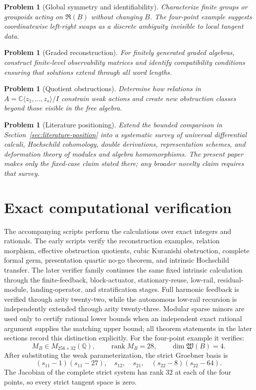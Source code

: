 \documentclass[11pt]{amsart}
\newtheorem{problem}[theorem]{Problem}
\newcommand{\rank}{\operatorname{rank}}
\newcommand{\Wfib}{\mathfrak W}
\newcommand{\Rfib}{\mathfrak R}
\newcommand{\C}{\mathbb C}
\begin{document}
\begin{problem}[Global symmetry and identifiability]
Characterize finite groups or groupoids acting on $\Rfib(B)$ without changing $B$.  The four-point example suggests coordinatewise left-right swaps as a discrete ambiguity invisible to local tangent data.
\end{problem}

\begin{problem}[Graded reconstruction]
For finitely generated graded algebras, construct finite-level observability matrices and identify compatibility conditions ensuring that solutions extend through all word lengths.
\end{problem}

\begin{problem}[Quotient obstructions]
Determine how relations in $A=\C\langle z_1,\ldots,z_s\rangle/I$ constrain weak actions and create new obstruction classes beyond those visible in the free algebra.
\end{problem}

\begin{problem}[Literature positioning]
Extend the bounded comparison in Section~\ref{sec:literature-position} into a systematic survey of universal differential calculi, Hochschild cohomology, double derivations, representation schemes, and deformation theory of modules and algebra homomorphisms.  The present paper makes only the fixed-case claim stated there; any broader novelty claim requires that survey.
\end{problem}

\appendix

\section{Exact computational verification}\label{sec:exact-verification}

The accompanying scripts perform the calculations over exact integers and rationals.  The early scripts verify the reconstruction examples, relation morphism, effective obstruction quotients, cubic Kuranishi obstruction, complete formal germ, presentation quartic no-go theorem, and intrinsic Hochschild transfer.  The later verifier family continues the same fixed intrinsic calculation through the finite-feedback, block-actuator, stationary-reuse, low-rail, residual-module, landing-operator, and stratification stages.  Full harmonic feedback is verified through arity twenty-two, while the autonomous low-rail recursion is independently extended through arity twenty-three.  Modular sparse minors are used only to certify rational lower bounds when an independent exact rational argument supplies the matching upper bound; all theorem statements in the later sections record this distinction explicitly.  For the four-point example it verifies:
\[
M_B\in M_{256\times32}(\mathbb Q),
\qquad
\rank M_B=28,
\qquad
\dim\Wfib(B)=4.
\]
After substituting the weak parameterization, the strict Groebner basis is
\[
(s_{11}-1)(s_{11}-27),\quad s_{12},\quad s_{21},\quad(s_{22}-8)(s_{22}-64).
\]
The Jacobian of the complete strict system has rank $32$ at each of the four points, so every strict tangent space is zero.
\end{document}
